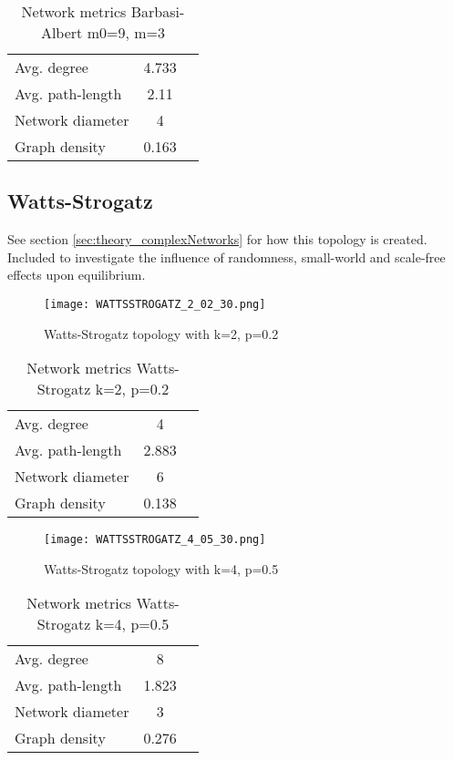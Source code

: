 \documentclass[Bachelorarbeit.tex]{subfiles}
\begin{document}
\begin{table}[H]
	\centering
	\caption{Network metrics Barbasi-Albert m0=9, m=3}
	\begin{tabular} { l c r }
		\hline
		Avg. degree & 4.733 \\
		Avg. path-length & 2.11 \\
		Network diameter & 4 \\
		Graph density & 0.163 \\
		\hline
	\end{tabular}
\end{table}

\pagebreak

\subsection{Watts-Strogatz}
See section \ref{sec:theory_complexNetworks} for how this topology is created. Included to investigate the influence of randomness, small-world and scale-free effects upon equilibrium.

\begin{figure}[H]
	\centering
  \texttt{[image: WATTSSTROGATZ\_2\_02\_30.png]}
	\caption{Watts-Strogatz topology with k=2, p=0.2}
	\label{fig:topology_WATTSSTROGATZ_2_02_30}
\end{figure}

\begin{table}[H]
	\centering
	\caption{Network metrics Watts-Strogatz k=2, p=0.2}
	\begin{tabular} { l c r }
		\hline
		Avg. degree & 4 \\
		Avg. path-length & 2.883 \\
		Network diameter & 6 \\
		Graph density & 0.138 \\
		\hline
	\end{tabular}
\end{table}

\begin{figure}[H]
	\centering
  \texttt{[image: WATTSSTROGATZ\_4\_05\_30.png]}
	\caption{Watts-Strogatz topology with k=4, p=0.5}
	\label{fig:topology_WATTSSTROGATZ_4_05_30}
\end{figure}

\begin{table}[h]
	\centering
	\caption{Network metrics Watts-Strogatz k=4, p=0.5}
	\begin{tabular} { l c r }
		\hline
		Avg. degree & 8 \\
		Avg. path-length & 1.823 \\
		Network diameter & 3 \\
		Graph density & 0.276 \\
		\hline
	\end{tabular}
\end{table}
\end{document}
